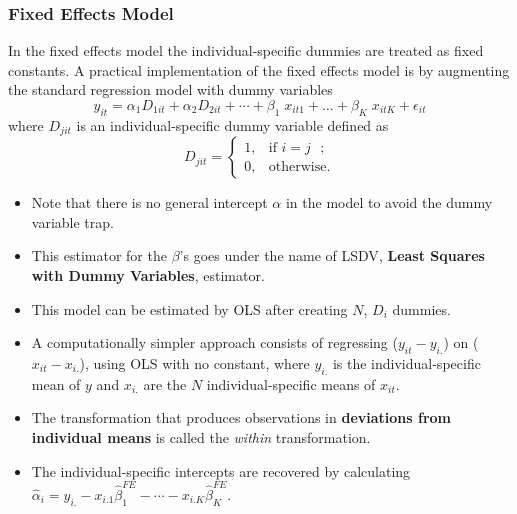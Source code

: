 \documentclass[landscape,letterpaper,9pt]{article}
\newcommand\cbox[1]{\colorbox{darkyellow}{#1}}
\begin{document}
\subsubsection{Fixed Effects Model}
In the fixed effects model the individual-specific dummies are treated as \cbox{fixed constants}.
A practical implementation of the fixed effects model is by augmenting the standard regression model with
dummy variables
\begin{equation}
y_{it} = \alpha_1 D_{1it} + \alpha_2 D_{2it} + \cdots+  \beta_1 \; x_{it1} + \dots+ \beta_K \; x_{itK}  +\epsilon_{it}
\end{equation}
where \(D_{jit}\) is an \cbox{individual-specific dummy} variable
defined as
\[
D_{jit} =
\begin{cases}
    1, &\text{if $i=j$ }; \\
    0, &\text{otherwise}.
\end{cases}
\]
\begin{itemize}
\item Note that there is no general intercept \(\alpha\) in the model to
avoid the dummy variable trap.
\item This  estimator for the \(\beta\)'s goes under the name of \cbox{LSDV}, \textbf{Least  Squares  with
Dummy Variables},  estimator.
\item This model can be estimated by \cbox{OLS} after creating \(N\), \(D_i\) dummies.
\item A computationally \cbox{simpler} approach consists of regressing (\(y_{it} - y_{i.}\)) on
(\(x_{it} - x_{i.}\)), using OLS with no constant, where
\(y_{i.}\) is the individual-specific mean of \(y\) and \(x_{i.}\) are the \(N\)
individual-specific means of \(x_{it}\).
\item The transformation that produces observations in \textbf{deviations from individual means}
is called the \cbox{\emph{within}} transformation.
\item The individual-specific intercepts are recovered by calculating
\(\widehat{\alpha}_i = y_{i.} -x_{i.1} \widehat{\beta}^{FE}_{1} - \cdots -x_{i.K} \widehat{\beta}^{FE}_{K}\).
\end{itemize}
\newpage
\end{document}
